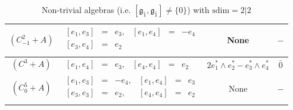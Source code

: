 \documentclass[12pt]{amsart}
\begin{document}
\begin{table}[H]
\begin{tabular}{| c | l | c |c|}
 $(C^2_{-1}+A)$ & $
\begin{array}{lcllcl}
[e_1, e_3]&=&e_3,  & [e_1,e_4]&=& - e_4 \\[1mm]
[e_3, e_4]&=&e_2\\
\end{array}$ & None & $-$\\ \hline
 $(C^3+A)$ & $
\begin{array}{lcllcl}
[e_1, e_4]&=&e_3,  & [e_4,e_4]&=& e_2 
\end{array}$ & $2 e_1^*\wedge e_2^* - e_3^*\wedge e_4^*$ & $\bar 0$\\ \hline
 $(C^5_0+A)$ & $
\begin{array}{lcllcl}
[e_1, e_3]&=& - e_4,  & [e_1,e_4]&=& e_3 \\[1mm]
[e_3, e_3]&=&e_2, & [e_4, e_4]&=&e_2\\
\end{array}$ & None & $-$\\
\hline
\end{tabular}
\caption{Non-trivial algebras (i.e. $[\mathfrak{g}_{\bar 1}, \mathfrak{g}_{\bar 1}]\not=\{0\}$) with $\mathrm{sdim}=2|2$}\label{tab2}
\end{table}
\end{document}

